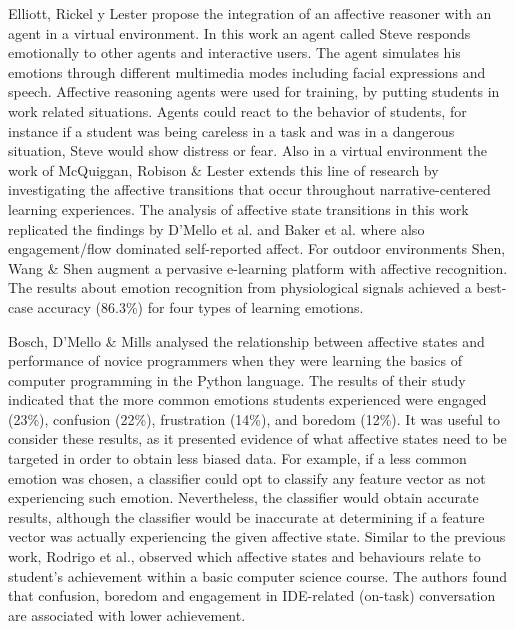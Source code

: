 \documentclass[conference]{IEEEtran}
\begin{document}
Elliott, Rickel y Lester \cite{elliott1999lifelike,d2008autotutor} propose the integration of an affective reasoner
with an agent in a virtual environment. In this work an agent called Steve
responds emotionally to other agents and interactive users. The agent simulates
his emotions through different multimedia modes including facial expressions and
speech. Affective reasoning agents were used for training, by putting students
in work related situations. Agents could react to the behavior of students, for
instance if a student was being careless in a task and was in a dangerous
situation, Steve would show distress or fear. Also in a virtual environment the
work of McQuiggan, Robison \& Lester \cite{mcquiggan2010affective} extends this line of research by
investigating the affective transitions that occur throughout narrative-centered
learning experiences. The analysis of affective state transitions in this work
replicated the findings by D’Mello et al. \cite{d2008autotutor} and Baker et al. 
\cite{rodrigo2009affective} where
also engagement/flow dominated self-reported affect. For outdoor environments
Shen, Wang \& Shen \cite{shen2009affective} augment a pervasive e-learning platform with affective
recognition.  The results about emotion recognition from physiological signals
achieved a best-case accuracy (86.3\%) for four types of learning emotions.

Bosch, D'Mello \& Mills \cite{bosch2013emotions} analysed the relationship between affective states
and performance of novice programmers when they were learning the basics of
computer programming in the Python language. The results of their study
indicated that the more common emotions students experienced were engaged
(23\%), confusion (22\%), frustration (14\%), and boredom (12\%). It was useful
to consider these results, as it presented evidence of what affective states
need to be targeted in order to obtain less biased data. For example, if a less
common emotion was chosen, a classifier could opt to classify any feature vector
as not experiencing such emotion. Nevertheless, the classifier would obtain
accurate results, although the classifier would be inaccurate at determining if
a feature vector was actually experiencing the given affective state. Similar to
the previous work, Rodrigo et al., \cite{rodrigo2009affective} observed which affective states and
behaviours relate to student's achievement within a basic computer science
course. The authors found that confusion, boredom and engagement in IDE-related
(on-task) conversation are associated with lower achievement.
\end{document}
